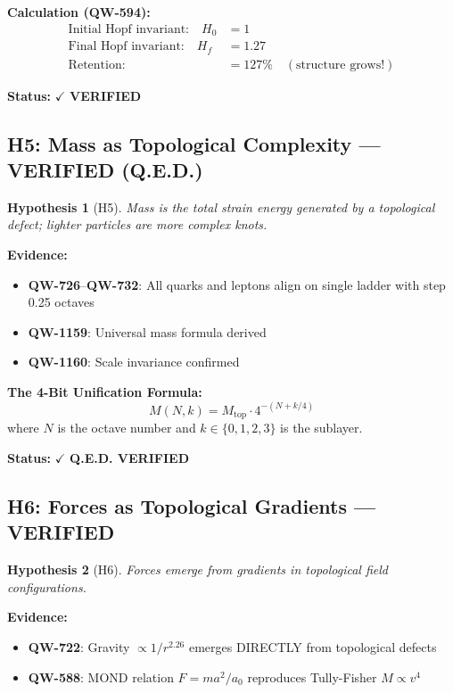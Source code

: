 \documentclass[11pt,a4paper]{book}
\newtheorem{hypothesis}{Hypothesis}[section]
\theoremstyle{remark}
\newcommand{\Mtop}{M_{\text{top}}}
\newcommand{\QW}[1]{\textbf{QW-#1}}
\begin{document}
\textbf{Calculation (\QW{594}):}
\begin{align}
\text{Initial Hopf invariant:} \quad H_0 &= 1 \\
\text{Final Hopf invariant:} \quad H_f &= 1.27 \\
\text{Retention:} \quad &= 127\% \quad (\text{structure grows!})
\end{align}

\textbf{Status:} $\checkmark$ \textbf{VERIFIED}

\subsection{H5: Mass as Topological Complexity --- VERIFIED (Q.E.D.)}

\begin{hypothesis}[H5]
Mass is the total strain energy generated by a topological defect; lighter particles are more complex knots.
\end{hypothesis}

\textbf{Evidence:}
\begin{itemize}
    \item \QW{726}--\QW{732}: All quarks and leptons align on single ladder with step 0.25 octaves
    \item \QW{1159}: Universal mass formula derived
    \item \QW{1160}: Scale invariance confirmed
\end{itemize}

\textbf{The 4-Bit Unification Formula:}
\begin{equation}
M(N, k) = \Mtop \cdot 4^{-(N + k/4)}
\end{equation}
where $N$ is the octave number and $k \in \{0, 1, 2, 3\}$ is the sublayer.

\textbf{Status:} $\checkmark$ \textbf{Q.E.D. VERIFIED}

\subsection{H6: Forces as Topological Gradients --- VERIFIED}

\begin{hypothesis}[H6]
Forces emerge from gradients in topological field configurations.
\end{hypothesis}

\textbf{Evidence:}
\begin{itemize}
    \item \QW{722}: Gravity $\propto 1/r^{2.26}$ emerges DIRECTLY from topological defects
    \item \QW{588}: MOND relation $F = ma^2/a_0$ reproduces Tully-Fisher $M \propto v^4$
\end{itemize}
\end{document}

